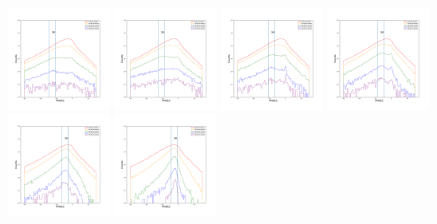 \documentclass[12pt,prd]{article}
\begin{document}
\begin{figure}[h!]
\includegraphics[width=0.24\textwidth]{../figures/scanning_plotsgaiascan_l22_5_b74_4_ra209_6_dec23_3_npy_6.pdf}
\includegraphics[width=0.24\textwidth]{../figures/scanning_plotsgaiascan_l22_5_b74_4_ra209_6_dec23_3_npy_7.pdf}
\includegraphics[width=0.24\textwidth]{../figures/scanning_plotsgaiascan_l22_5_b74_4_ra209_6_dec23_3_npy_8.pdf}
\includegraphics[width=0.24\textwidth]{../figures/scanning_plotsgaiascan_l22_5_b74_4_ra209_6_dec23_3_npy_9.pdf}
\includegraphics[width=0.24\textwidth]{../figures/scanning_plotsgaiascan_l22_5_b74_4_ra209_6_dec23_3_npy_10.pdf}
\includegraphics[width=0.24\textwidth]{../figures/scanning_plotsgaiascan_l22_5_b74_4_ra209_6_dec23_3_npy_11.pdf}

\end{figure}
\end{document}
